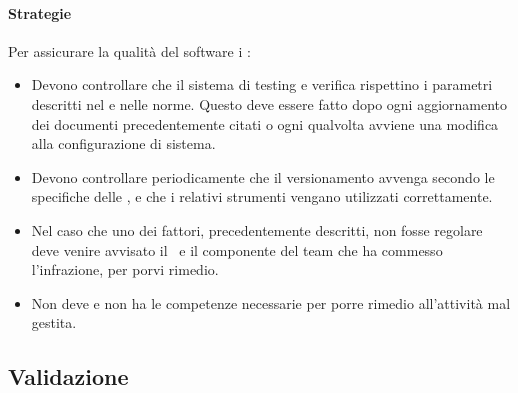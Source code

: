 \documentclass[../NormeDiProgetto_v3.0.0.tex]{subfiles}
\begin{document}
				\paragraph{Strategie}
				Per assicurare la qualità del software i \verificatori:
				\begin{itemize}
					\item Devono controllare che il sistema di testing e verifica rispettino i parametri descritti nel \pianodiqualifica e nelle norme. Questo deve essere fatto dopo ogni aggiornamento dei documenti precedentemente citati o ogni qualvolta avviene una modifica alla configurazione di sistema.  
					\item Devono controllare periodicamente che il versionamento avvenga secondo le specifiche delle \normediprogetto, e che i relativi strumenti vengano utilizzati correttamente.
					\item Nel caso che uno dei fattori, precedentemente descritti, non fosse regolare deve venire avvisato il \responsabilediprogetto\ e il componente del team che ha commesso l'infrazione, per porvi rimedio.
					\item Non deve e non ha le competenze necessarie per porre rimedio all'attività mal gestita.
				\end{itemize}



		
		\subsection{Validazione}
\end{document}
